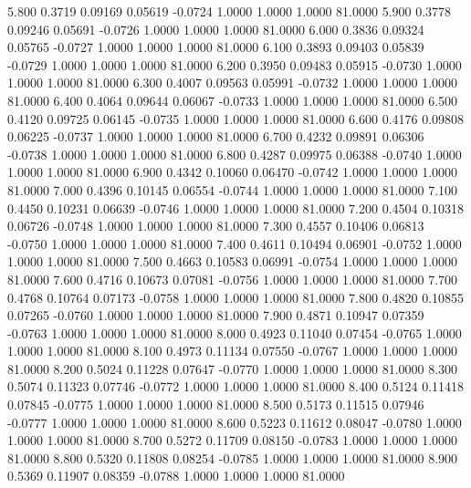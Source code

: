    5.800   0.3719   0.09169   0.05619  -0.0724   1.0000   1.0000   1.0000  81.0000
   5.900   0.3778   0.09246   0.05691  -0.0726   1.0000   1.0000   1.0000  81.0000
   6.000   0.3836   0.09324   0.05765  -0.0727   1.0000   1.0000   1.0000  81.0000
   6.100   0.3893   0.09403   0.05839  -0.0729   1.0000   1.0000   1.0000  81.0000
   6.200   0.3950   0.09483   0.05915  -0.0730   1.0000   1.0000   1.0000  81.0000
   6.300   0.4007   0.09563   0.05991  -0.0732   1.0000   1.0000   1.0000  81.0000
   6.400   0.4064   0.09644   0.06067  -0.0733   1.0000   1.0000   1.0000  81.0000
   6.500   0.4120   0.09725   0.06145  -0.0735   1.0000   1.0000   1.0000  81.0000
   6.600   0.4176   0.09808   0.06225  -0.0737   1.0000   1.0000   1.0000  81.0000
   6.700   0.4232   0.09891   0.06306  -0.0738   1.0000   1.0000   1.0000  81.0000
   6.800   0.4287   0.09975   0.06388  -0.0740   1.0000   1.0000   1.0000  81.0000
   6.900   0.4342   0.10060   0.06470  -0.0742   1.0000   1.0000   1.0000  81.0000
   7.000   0.4396   0.10145   0.06554  -0.0744   1.0000   1.0000   1.0000  81.0000
   7.100   0.4450   0.10231   0.06639  -0.0746   1.0000   1.0000   1.0000  81.0000
   7.200   0.4504   0.10318   0.06726  -0.0748   1.0000   1.0000   1.0000  81.0000
   7.300   0.4557   0.10406   0.06813  -0.0750   1.0000   1.0000   1.0000  81.0000
   7.400   0.4611   0.10494   0.06901  -0.0752   1.0000   1.0000   1.0000  81.0000
   7.500   0.4663   0.10583   0.06991  -0.0754   1.0000   1.0000   1.0000  81.0000
   7.600   0.4716   0.10673   0.07081  -0.0756   1.0000   1.0000   1.0000  81.0000
   7.700   0.4768   0.10764   0.07173  -0.0758   1.0000   1.0000   1.0000  81.0000
   7.800   0.4820   0.10855   0.07265  -0.0760   1.0000   1.0000   1.0000  81.0000
   7.900   0.4871   0.10947   0.07359  -0.0763   1.0000   1.0000   1.0000  81.0000
   8.000   0.4923   0.11040   0.07454  -0.0765   1.0000   1.0000   1.0000  81.0000
   8.100   0.4973   0.11134   0.07550  -0.0767   1.0000   1.0000   1.0000  81.0000
   8.200   0.5024   0.11228   0.07647  -0.0770   1.0000   1.0000   1.0000  81.0000
   8.300   0.5074   0.11323   0.07746  -0.0772   1.0000   1.0000   1.0000  81.0000
   8.400   0.5124   0.11418   0.07845  -0.0775   1.0000   1.0000   1.0000  81.0000
   8.500   0.5173   0.11515   0.07946  -0.0777   1.0000   1.0000   1.0000  81.0000
   8.600   0.5223   0.11612   0.08047  -0.0780   1.0000   1.0000   1.0000  81.0000
   8.700   0.5272   0.11709   0.08150  -0.0783   1.0000   1.0000   1.0000  81.0000
   8.800   0.5320   0.11808   0.08254  -0.0785   1.0000   1.0000   1.0000  81.0000
   8.900   0.5369   0.11907   0.08359  -0.0788   1.0000   1.0000   1.0000  81.0000
